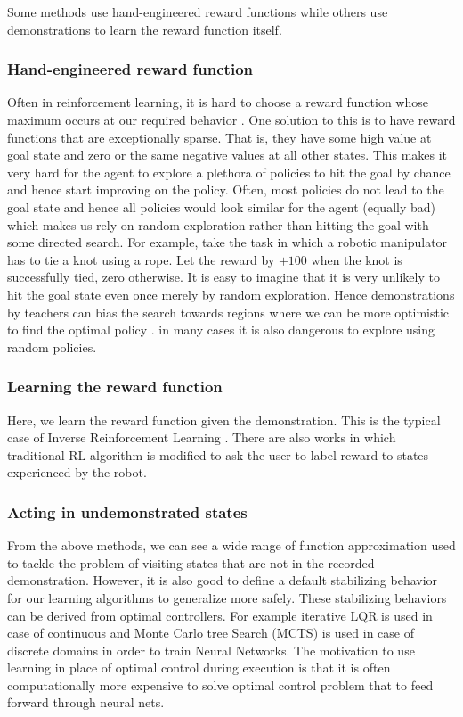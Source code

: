 \documentclass{article}[11pt]
\begin{document}
Some methods use hand-engineered reward functions while others use demonstrations to learn the reward function itself. 

\subsubsection{Hand-engineered reward function}
Often in reinforcement learning, it is hard to choose a reward function whose maximum occurs at our required behavior \cite{fault}. One solution to this is to have reward functions that are exceptionally sparse. That is, they have some high value at goal state and zero or the same negative values at all other states. This makes it very hard for the agent to explore a plethora of policies to hit the goal by chance and hence start improving on the policy. Often, most policies do not lead to the goal state and hence all policies would look similar for the agent (equally bad) which makes us rely on random exploration rather than hitting the goal with some directed search. For example, take the task in which a robotic manipulator has to tie a knot using a rope. Let the reward by $+100$ when the knot is successfully tied, zero otherwise. It is easy to imagine that it is very unlikely to hit the goal state even once merely by random exploration. Hence demonstrations by teachers can bias the search towards regions where we can be more optimistic to find the optimal policy \cite{brys2015reinforcement}. in many cases it is also dangerous to explore using random policies.  


\subsubsection{Learning the reward function}
Here, we learn the reward function given the demonstration. This is the typical case of Inverse Reinforcement Learning \cite{irl}. There are also works in which traditional RL algorithm is modified to ask the user to label reward to states experienced by the robot. 

\subsubsection{Acting in undemonstrated states}   
From the above methods, we can see a wide range of function approximation used to tackle the problem of visiting states that are not in the recorded demonstration. However, it is also good to define a default stabilizing behavior for our learning algorithms to generalize more safely. These stabilizing behaviors can be derived from optimal controllers. For example iterative LQR is used in case of continuous and Monte Carlo tree Search (MCTS) is used in case of discrete domains \cite{mcts} in order to train Neural Networks. The motivation to use learning in place of optimal control during execution is that it is often computationally more expensive to solve optimal control problem that to feed forward through neural nets. 
\end{document}
